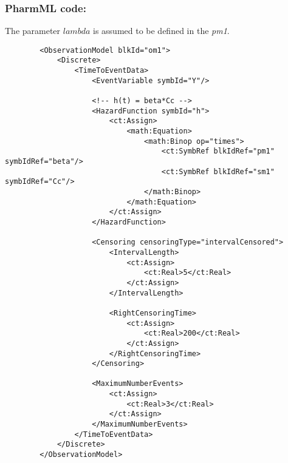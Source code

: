 \subsubsection{PharmML code:}
The parameter $lambda$ is assumed to be defined in the  \emph{pm1}.

\lstset{language=XML}
\begin{lstlisting}
        <ObservationModel blkId="om1">
            <Discrete>
                <TimeToEventData>
                    <EventVariable symbId="Y"/>
                    
                    <!-- h(t) = beta*Cc -->
                    <HazardFunction symbId="h">
                        <ct:Assign>
                            <math:Equation>
                                <math:Binop op="times">
                                    <ct:SymbRef blkIdRef="pm1" symbIdRef="beta"/>
                                    <ct:SymbRef blkIdRef="sm1" symbIdRef="Cc"/>
                                </math:Binop>
                            </math:Equation>
                        </ct:Assign>   
                    </HazardFunction>
                    
                    <Censoring censoringType="intervalCensored">
                        <IntervalLength>
                            <ct:Assign>
                                <ct:Real>5</ct:Real> 
                            </ct:Assign>
                        </IntervalLength>
                        
                        <RightCensoringTime>
                            <ct:Assign>
                                <ct:Real>200</ct:Real> 
                            </ct:Assign>
                        </RightCensoringTime>
                    </Censoring>
                    
                    <MaximumNumberEvents>
                        <ct:Assign>
                            <ct:Real>3</ct:Real> 
                        </ct:Assign>
                    </MaximumNumberEvents>
                </TimeToEventData>
            </Discrete>
        </ObservationModel>
 \end{lstlisting}





